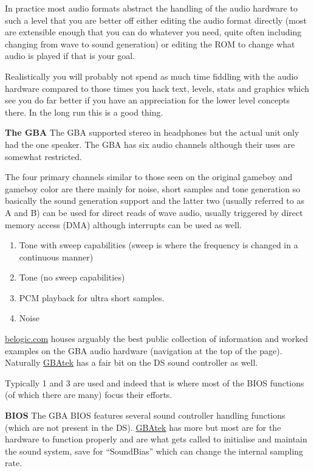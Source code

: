 \documentclass[
]{book}
\providecommand{\tightlist}{%
  \setlength{\itemsep}{0pt}\setlength{\parskip}{0pt}}
\begin{document}
In practice most audio formats abstract the handling of the audio hardware to such a level that you are better off either editing the audio format directly (most are extensible enough that you can do whatever you need, quite often including changing from wave to sound generation) or editing the ROM to change what audio is played if that is your goal.

Realistically you will probably not spend as much time fiddling with the audio hardware compared to those times you hack text, levels, stats and graphics which see you do far better if you have an appreciation for the lower level concepts there. In the long run this is a good thing.

\textbf{The GBA} The GBA supported stereo in headphones but the actual unit only had the one speaker. The GBA has six audio channels although their uses are somewhat restricted.

The four primary channels similar to those seen on the original gameboy and gameboy color are there mainly for noise, short samples and tone generation so basically the sound generation support and the latter two (usually referred to as A and B) can be used for direct reads of wave audio, usually triggered by direct memory access (DMA) although interrupts can be used as well.

\begin{enumerate}
\def\labelenumi{\arabic{enumi}.}
\tightlist
\item
  Tone with sweep capabilities (sweep is where the frequency is changed in a continuous manner)
\item
  Tone (no sweep capabilities)
\item
  PCM playback for ultra short samples.
\item
  Noise
\end{enumerate}

\href{http://belogic.com/gba/}{belogic.com} houses arguably the best public collection of information and worked examples on the GBA audio hardware (navigation at the top of the page). Naturally \href{http://problemkaputt.de/gbatek.htm\#gbasoundcontroller}{GBAtek} has a fair bit on the DS sound controller as well.

Typically 1 and 3 are used and indeed that is where most of the BIOS functions (of which there are many) focus their efforts.

\textbf{BIOS} The GBA BIOS features several sound controller handling functions (which are not present in the DS). \href{http://problemkaputt.de/gbatek.htm\#biossoundfunctions}{GBAtek} has more but most are for the hardware to function properly and are what gets called to initialise and maintain the sound system, save for ``SoundBias'' which can change the internal sampling rate.
\end{document}
